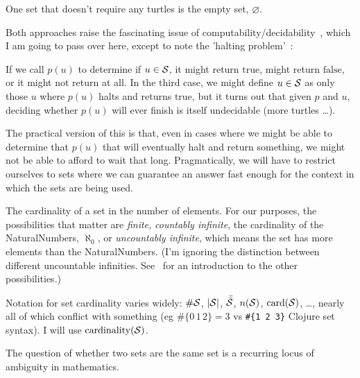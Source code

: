 One set that doesn't require any turtles is 
the empty set, $\varnothing$.


Both approaches raise the fascinating issue of 
computability/decidability~\cite{Church:1936:Unsolvable,
Turing:1936:Computability,
Turing:1938:ComputabilityCorrection,
Turing:1937:ComputabilityLambda},
which I am going to pass over here, except to note the 
'halting problem'~\cite{wiki:HaltingProblem}:

If we call $p(u)$ to determine if $u \in \mathcal{S}$, 
it might return $\text{true}$, might return $\text{false}$,
or it might not return at all.
In the third case, we might define $u \in \mathcal{S}$ as only those
$u$ where $p(u)$ halts and returns $\text{true}$, but it turns 
out that given $p$ and $u$, deciding whether $p(u)$ will ever
finish is itself undecidable (more turtles \ldots).

The practical version of this is that, even in cases where we
might be able to determine that $p(u)$ that will eventually halt
and return something, we might not be able to afford to wait that
long.
Pragmatically, we will have to restrict ourselves to sets where we
can guarantee an answer fast enough for the context in which the
sets are being used.


The cardinality of a set in the number of elements.
For our purposes, the possibilities that matter are \emph{finite,}
\emph{countably infinite}, the cardinality of the
\gls{NaturalNumbers}, $\aleph_{0}$, or \emph{uncountably
infinite}, which means the set has more elements than the
\gls{NaturalNumbers}.
(I'm ignoring the distinction between different uncountable
infinities.
See~\cite{wiki:CardinalNumbers} for an introduction to the other
possibilities.)

Notation for set cardinality varies widely:
$\#\mathcal{S}$,  $|\mathcal{S}|$,
$\bar{\bar{\mathcal{S}}}$, $n(\mathcal{S})$,
$\text{card}(\mathcal{S})$, \ldots, nearly all of which conflict
with something (eg $\#\{ 0 \, 1 \, 2 \} = 3$ vs 
\lstinline|#{1 2 3}| Clojure set syntax).
I will use $\text{cardinality}(\mathcal{S})$.


The question of whether two sets are the same set is a recurring
locus of ambiguity in mathematics.

